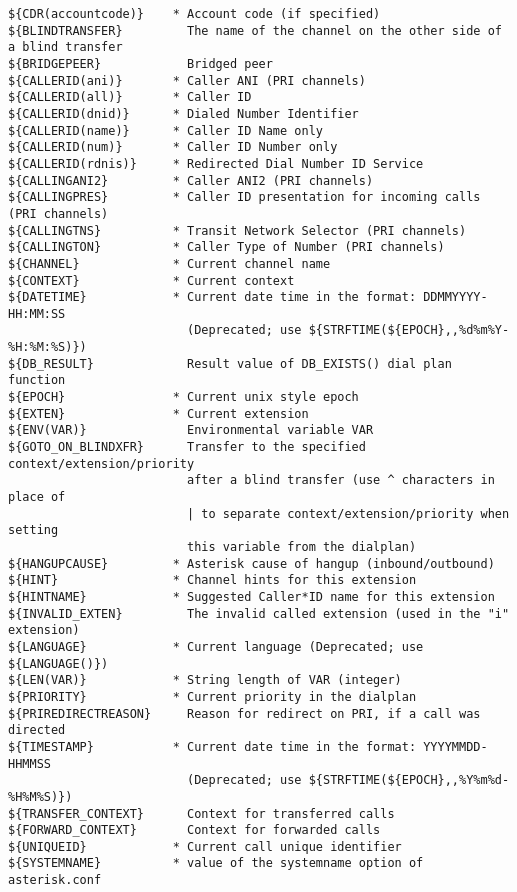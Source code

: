 \begin{verbatim}
${CDR(accountcode)}    * Account code (if specified)
${BLINDTRANSFER}         The name of the channel on the other side of a blind transfer
${BRIDGEPEER}            Bridged peer
${CALLERID(ani)}       * Caller ANI (PRI channels)
${CALLERID(all)}       * Caller ID
${CALLERID(dnid)}      * Dialed Number Identifier
${CALLERID(name)}      * Caller ID Name only
${CALLERID(num)}       * Caller ID Number only
${CALLERID(rdnis)}     * Redirected Dial Number ID Service
${CALLINGANI2}         * Caller ANI2 (PRI channels)
${CALLINGPRES}         * Caller ID presentation for incoming calls (PRI channels)
${CALLINGTNS}          * Transit Network Selector (PRI channels)
${CALLINGTON}          * Caller Type of Number (PRI channels)
${CHANNEL}             * Current channel name
${CONTEXT}             * Current context
${DATETIME}            * Current date time in the format: DDMMYYYY-HH:MM:SS 
                         (Deprecated; use ${STRFTIME(${EPOCH},,%d%m%Y-%H:%M:%S)})
${DB_RESULT}             Result value of DB_EXISTS() dial plan function
${EPOCH}               * Current unix style epoch
${EXTEN}               * Current extension
${ENV(VAR)}              Environmental variable VAR
${GOTO_ON_BLINDXFR}      Transfer to the specified context/extension/priority
                         after a blind transfer (use ^ characters in place of
                         | to separate context/extension/priority when setting
                         this variable from the dialplan)
${HANGUPCAUSE}         * Asterisk cause of hangup (inbound/outbound)
${HINT}                * Channel hints for this extension
${HINTNAME}            * Suggested Caller*ID name for this extension
${INVALID_EXTEN}         The invalid called extension (used in the "i" extension)
${LANGUAGE}            * Current language (Deprecated; use ${LANGUAGE()})
${LEN(VAR)}            * String length of VAR (integer)
${PRIORITY}            * Current priority in the dialplan
${PRIREDIRECTREASON}     Reason for redirect on PRI, if a call was directed
${TIMESTAMP}           * Current date time in the format: YYYYMMDD-HHMMSS 
                         (Deprecated; use ${STRFTIME(${EPOCH},,%Y%m%d-%H%M%S)})
${TRANSFER_CONTEXT}      Context for transferred calls
${FORWARD_CONTEXT}       Context for forwarded calls
${UNIQUEID}            * Current call unique identifier
${SYSTEMNAME}          * value of the systemname option of asterisk.conf
\end{verbatim}

